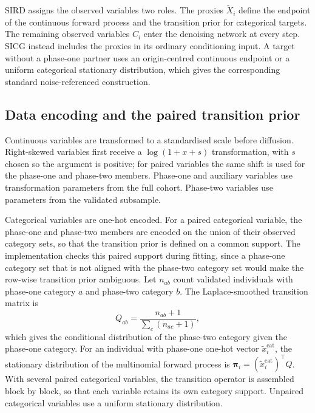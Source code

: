SIRD assigns the observed variables two roles. The proxies $\tilde X_i$ define the endpoint of the continuous forward process and the transition prior for categorical targets. The remaining observed variables $C_i$ enter the denoising network at every step. SICG instead includes the proxies in its ordinary conditioning input. A target without a phase-one partner uses an origin-centred continuous endpoint or a uniform categorical stationary distribution, which gives the corresponding standard noise-referenced construction.


\subsection{Data encoding and the paired transition prior}
\label{sec:sird_encoding}

Continuous variables are transformed to a standardised scale before diffusion. Right-skewed variables first receive a $\log(1+x+s)$ transformation, with \(s\) chosen so the argument is positive; for paired variables the same shift is used for the phase-one and phase-two members. Phase-one and auxiliary variables use transformation parameters from the full cohort. Phase-two variables use parameters from the validated subsample.

Categorical variables are one-hot encoded. For a paired categorical variable, the phase-one and phase-two members are encoded on the union of their observed category sets, so that the transition prior is defined on a common support. The implementation checks this paired support during fitting, since a phase-one category set that is not aligned with the phase-two category set would make the row-wise transition prior ambiguous. Let \(n_{ab}\) count validated individuals with phase-one category \(a\) and phase-two category \(b\). The Laplace-smoothed transition matrix is
\begin{equation}
Q_{ab} = \frac{n_{ab} + 1}{\sum_{c} (n_{ac} + 1)},
\label{eq:transition_matrix}
\end{equation}
which gives the conditional distribution of the phase-two category given the phase-one category. For an individual with phase-one one-hot vector \(\tilde{x}_i^{\text{cat}}\), the stationary distribution of the multinomial forward process is \(\boldsymbol{\pi}_i = (\tilde{x}_i^{\text{cat}})^{\top} Q\). With several paired categorical variables, the transition operator is assembled block by block, so that each variable retains its own category support. Unpaired categorical variables use a uniform stationary distribution.


